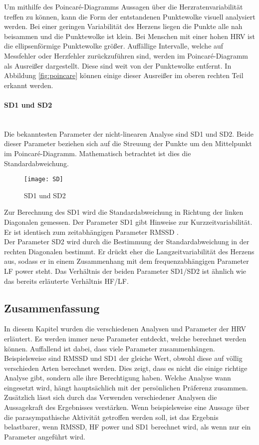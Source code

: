 Um mithilfe des Poincaré-Diagramms Aussagen über die Herzratenvariabilität treffen zu können, kann die Form der entstandenen Punktewolke visuell analysiert werden. Bei einer geringen Variabilität des Herzens liegen die Punkte alle nah beisammen und die Punktewolke ist klein. Bei Menschen mit einer hohen \acs{HRV} ist die ellipsenförmige Punktewolke größer. Auffällige Intervalle, welche auf Messfehler oder Herzfehler zurückzuführen sind, werden im Poincaré-Diagramm als Ausreißer dargestellt. Diese sind weit von der Punktewolke entfernt. In Abbildung \ref{fig:poincare} können einige dieser Ausreißer im oberen rechten Teil erkannt werden.

\paragraph{SD1 und SD2}\mbox{} \\
Die bekanntesten Parameter der nicht-linearen Analyse sind SD1 und SD2. Beide dieser Parameter beziehen sich auf die Streuung der Punkte um den Mittelpunkt im Poincaré-Diagramm. Mathematisch betrachtet ist dies die Standardabweichung.\cite{poincare}
\begin{figure}[H]
	\centering
	\texttt{[image: SD]}
	\caption{SD1 und SD2}
	\label{fig:SD}
	\cite{poincare}
\end{figure}

Zur Berechnung des SD1 wird die Standardabweichung in Richtung der linken Diagonalen gemessen. Der Parameter SD1 gibt Hinweise zur Kurzzeitvariabilität. Er ist identisch zum zeitabhängigen Parameter \acs{RMSSD} \cite[S.6]{med}. \\

Der Parameter SD2 wird durch die Bestimmung der Standardabweichung in der rechten Diagonalen bestimmt. Er drückt eher die Langzeitvariabilität des Herzens aus, sodass er in einem Zusammenhang mit dem frequenzabhängigen Parameter \acs{LF} power steht. Das Verhältnis der beiden Parameter SD1/SD2 ist ähnlich wie das bereits erläuterte Verhältnis \acs{HF}/\acs{LF}. \cite[S.7]{med} 

\subsection{Zusammenfassung}

In diesem Kapitel wurden die verschiedenen Analysen und Parameter der \acs{HRV} erläutert. Es werden immer neue Parameter entdeckt, welche berechnet werden können. Auffallend ist dabei, dass viele Parameter zusammenhängen. Beispielsweise sind \acs{RMSSD} und SD1 der gleiche Wert, obwohl diese auf völlig verschieden Arten berechnet werden. Dies zeigt, dass es nicht die einige richtige Analyse gibt, sondern alle ihre Berechtigung haben. Welche Analyse wann eingesetzt wird, hängt hauptsächlich mit der persönlichen Präferenz zusammen.\\
Zusätzlich lässt sich durch das Verwenden verschiedener Analysen die Aussagekraft des Ergebnisses verstärken. Wenn beispielsweise eine Aussage über die parasympathische Aktivität getroffen werden soll, ist das Ergebnis belastbarer, wenn \acs{RMSSD}, \acs{HF} power und SD1 berechnet wird, als wenn nur ein Parameter angeführt wird. \\


